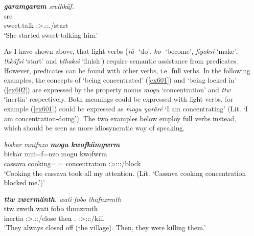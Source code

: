 \begin{exe}
	\ex \emph{\textbf{garamgaram} srethkäf.}\\
	 sre\\
	sweet.talk \Stsg{}:\Sbj{}>\Tsg{}.\Masc{}:\Obj{}:\Irr{}.\Pfv{}/start\\
	\trans `She started sweet-talking him.'
	\label{ex600}
\end{exe}

As I have shown above, that light verbs (\emph{rä-} `do', \emph{ko-} `become', \emph{fiyoksi} `make', \emph{thkäfsi} `start' and \emph{bthaksi} `finish') require semantic assistance from  predicates. However,  predicates can be found with other verbs, i.e. full verbs. In the following examples, the concepts of `being concentrated' (\ref{ex601}) and `being locked in' (\ref{ex602}) are expressed by the property nouns \emph{mogu} `concentration' and \emph{ttw} `inertia' respectively. Both meanings could be expressed with light verbs, for example (\ref{ex601}) could be expressed as \emph{mogu ŋaräré} `I am concentrating' (Lit. `I am concentration-doing'). The two examples below employ full verbs instead, which should be seen as more idiosyncratic way of speaking.

\begin{exe}
	\ex \emph{biskar mnifnzo \textbf{mogu kwofkämgwrm}}\\
	\gll biskar mni=f=nzo mogu kwofwrm\\
	cassava cooking=\Erg.\Sg=\Only{} concentration \Stsg:\Sbj>\Fsg:\Obj:\Pst:\Dur/block\\
	\trans `Cooking the cassava took all my attention. (Lit. `Cassava cooking concentration blocked me.')'\\
	\label{ex601}
\end{exe}
\begin{exe}
	\ex \emph{\textbf{ttw zwermänth}. wati fobo thufnzrmth}\\
	\gll ttw zweth wati fobo thunzrmth\\
	inertia \Stpl:\Sbj>\Tsg.\F:\Obj:\Iter/close then \Dist.\All{} \Stpl:\Sbj>\Stpl:\Obj:\Pst:\Dur/kill\\
	\trans `They always closed off (the village). Then, they were killing them.'\\
	\label{ex602}
\end{exe}

